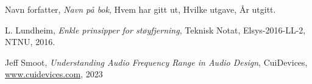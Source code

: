 
  Navn forfatter,
  \emph{Navn på bok},
  Hvem har gitt ut,
  Hvilke utgave,
  År utgitt.

  L. Lundheim,
  \emph{Enkle prinsipper for støyfjerning},
  Teknisk Notat,
  Elsys-2016-LL-2,
  NTNU,
  2016.
  
  Jeff Smoot,
  \emph{Understanding Audio Frequency Range in Audio Design},
  CuiDevices,
  \href{https://www.cuidevices.com/blog/understanding-audio-frequency-range-in-audio-design}{www.cuidevices.com},
  2023


